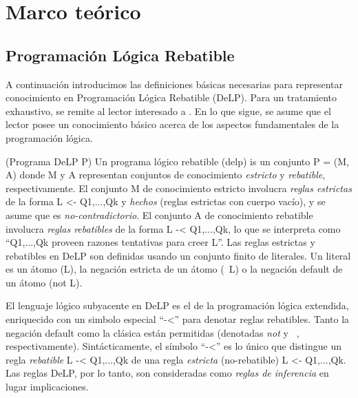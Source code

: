 \section{Marco teórico}

\subsection{Programación Lógica Rebatible}


A continuación introducimos las definiciones básicas necesarias para representar conocimiento
en Programación Lógica Rebatible (DeLP). Para un tratamiento exhaustivo, se remite al lector
interesado a %
. En lo que sigue, se asume que el lector posee un conocimiento básico acerca de los aspectos
fundamentales de la programación lógica.

\begin{definicion}(Programa DeLP P)
	Un programa lógico rebatible (delp) is un conjunto P = (M, A) donde M y A representan conjuntos
	de conocimiento \textit{estricto} y \textit{rebatible}, respectivamente. El conjunto M de 
	conocimiento estricto involucra \textit{reglas estrictas} de la forma L <- Q1,...,Qk y \textit{hechos}
	(reglas estrictas con cuerpo vacío), y se asume que es \textit{no-contradictorio}. El conjunto A 
	de conocimiento rebatible involucra \textit{reglas rebatibles} de la forma L -< Q1,...,Qk, lo que 
	se interpreta como ``Q1,...,Qk proveen razones tentativas para creer L''. Las reglas estrictas y
	rebatibles en DeLP son definidas usando un conjunto finito de literales. Un literal es un átomo (L),
	la negación estricta de un átomo (~L) o la negación default de un átomo (not L). %
\end{definicion}

El lenguaje lógico subyacente en DeLP es el de la programación lógica extendida, %
enriquecido con un simbolo especial ``-<'' para denotar reglas rebatibles. Tanto la negación 
default como la clásica están permitidas (denotadas \textit{not} y \textit{~}, respectivamente).
Sintácticamente, el símbolo ``-<'' es lo único que distingue un regla \textit{rebatible} L -< Q1,...,Qk
de una regla \textit{estricta} (no-rebatible) L <- Q1,...,Qk. Las reglas DeLP, por lo tanto, son 
consideradas como \textit{reglas de inferencia} en lugar implicaciones.

